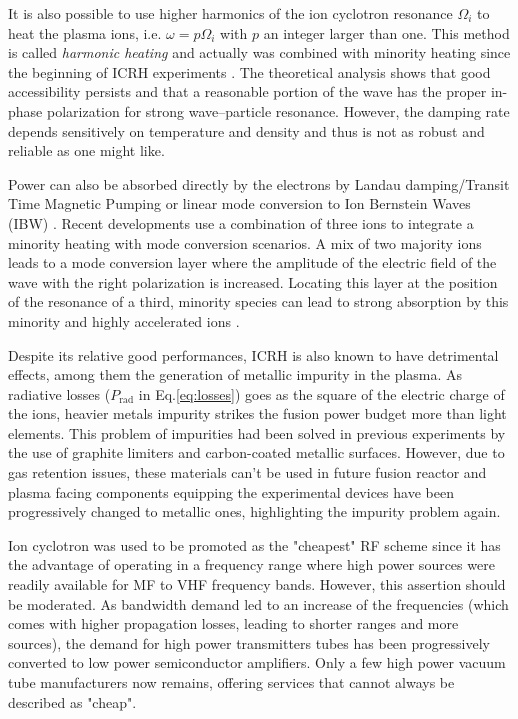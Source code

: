 It is also possible to use higher harmonics of the ion cyclotron resonance $\Omega_i$ to heat the plasma ions, i.e. $\omega = p \Omega_{i}$ with $p$ an integer larger than one. This method is called \textit{harmonic heating} and actually was combined with minority heating since the beginning of ICRH experiments . The theoretical analysis shows that good accessibility persists and that a reasonable portion of the wave has the proper in-phase polarization for strong wave–particle resonance. However, the damping rate depends sensitively on temperature and density and thus is not as robust and reliable as one might like\cite{Freidberg2007}. 

Power can also be absorbed directly by the electrons by Landau damping/Transit Time Magnetic Pumping or linear mode conversion to Ion Bernstein Waves (IBW) . Recent developments use a combination of three ions to integrate a minority heating with mode conversion scenarios. A mix of two majority ions leads to a mode conversion layer where the amplitude of the electric field of the wave with the right polarization is increased. Locating this layer at the position of the resonance of a third, minority species can lead to strong absorption by this minority and highly accelerated ions .

Despite its relative good performances, ICRH is also known to have detrimental effects, among them the generation of metallic impurity in the plasma. As radiative losses ($P_{\mathrm{rad}}$ in Eq.\ref{eq:losses}) goes as the square of the electric charge of the ions, heavier metals impurity strikes the fusion power budget more than light elements. This problem of impurities had been solved in previous experiments by the use of graphite limiters and carbon-coated metallic surfaces. However, due to gas retention issues, these materials can't be used in future fusion reactor and plasma facing components equipping the experimental devices have been progressively changed to metallic ones, highlighting the impurity problem again.

Ion cyclotron was used to be promoted as the "cheapest" RF scheme since it has the advantage of operating in a frequency range where high power sources were readily available for MF to VHF frequency bands. However, this assertion should be moderated. As bandwidth demand led to an increase of the frequencies (which comes with higher propagation losses, leading to shorter ranges and more sources), the demand for high power transmitters tubes has been progressively converted to low power semiconductor amplifiers. Only a few high power vacuum tube manufacturers now remains, offering services that cannot always be described as "cheap".



